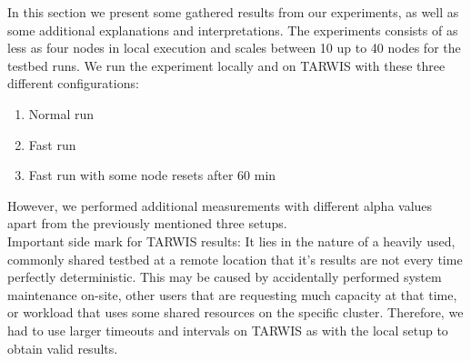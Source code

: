 \documentclass{llncs}
\begin{document}
In this section we present some gathered results from our experiments, as well as some additional explanations and interpretations. The experiments consists of as less as four nodes in local execution and scales between 10 up to 40 nodes for the testbed runs. We run the experiment locally and on TARWIS with these three different configurations:
\begin{enumerate}
\item Normal run
\item Fast run
\item Fast run with some node resets after 60 min
\end{enumerate}
However, we performed additional measurements with different alpha values apart from the previously mentioned three setups.\\
Important side mark for TARWIS results: It lies in the nature of a heavily used, commonly shared testbed at a remote location that it's results are not every time perfectly deterministic. This may be caused by accidentally performed system maintenance on-site, other users that are requesting much capacity at that time, or workload that uses some shared resources on the specific cluster. Therefore, we had to use larger timeouts and intervals on TARWIS as with the local setup to obtain valid results.
\end{document}
